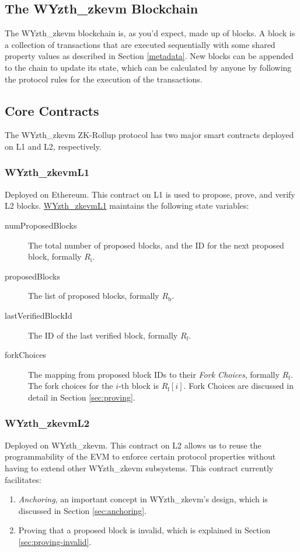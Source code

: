 \documentclass[9pt,oneside]{amsart}
\begin{document}
\begin{multicols}{2}
\section{The WYzth_zkevm Blockchain}
The WYzth_zkevm blockchain is, as you'd expect, made up of blocks. A block is a collection of transactions that are executed sequentially with some shared property values as described in Section \ref{metadata}. New blocks can be appended to the chain to update its state, which can be calculated by anyone by following the protocol rules for the execution of the transactions.

\subsection{Core Contracts}
The WYzth_zkevm ZK-Rollup protocol has two major smart contracts deployed on L1 and L2, respectively.

\subsubsection{WYzth_zkevmL1} Deployed on Ethereum. This contract on L1 is used to propose, prove, and verify L2 blocks. \underline{WYzth_zkevmL1} maintains the following state variables:

\begin{description}
\item[numProposedBlocks] The total number of proposed blocks, and the ID for the next proposed block, formally $R_\mathrm{i}$.
\item[proposedBlocks] The list of proposed blocks, formally $R_\mathrm{b}$.
\item[lastVerifiedBlockId] The ID of the last verified block, formally $R_\mathrm{f}$.
\item[forkChoices] The mapping from proposed block IDs to their \emph{Fork Choices}, formally $R_\mathrm{f}$. The fork choices for the $i$-th block is $R_\mathrm{f}[i]$. Fork Choices are discussed in detail in Section \ref{sec:proving}.
\end{description}

\subsubsection{{WYzth_zkevmL2}} Deployed on WYzth_zkevm. This contract on L2 allows us to reuse the programmability of the EVM to enforce certain protocol properties without having to extend other WYzth_zkevm subsystems. This contract currently facilitates:
\begin{enumerate}
\item \emph{Anchoring}, an important concept in WYzth_zkevm's design, which is discussed in Section \ref{sec:anchoring}.
\item Proving that a proposed block is invalid, which is explained in Section \ref{sec:proving-invalid}.
\end{enumerate}


\end{multicols}
\end{document}
